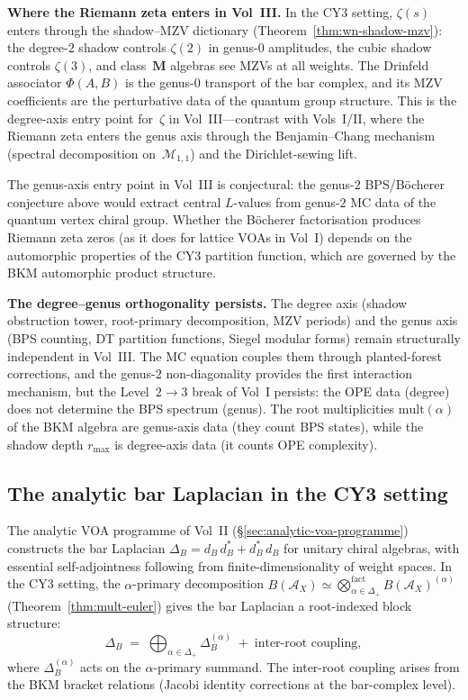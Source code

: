 \documentclass[11pt]{article}
\newcommand{\cA}{\mathcal{A}}
\newcommand{\cM}{\mathcal{M}}
\begin{document}
\textbf{Where the Riemann zeta enters in Vol~III.}
In the CY3 setting, $\zeta(s)$ enters through the
shadow--MZV dictionary (Theorem~\ref{thm:wn-shadow-mzv}):
the degree-$2$ shadow controls $\zeta(2)$ in genus-$0$ amplitudes,
the cubic shadow controls $\zeta(3)$, and class~$\mathbf{M}$
algebras see MZVs at all weights. The Drinfeld associator
$\Phi(A,B)$ is the genus-$0$ transport of the bar complex, and
its MZV coefficients are the perturbative data of the quantum
group structure. This is the degree-axis entry point for~$\zeta$
in Vol~III---contrast with Vols~I/II, where the Riemann zeta
enters the genus axis through the Benjamin--Chang mechanism
(spectral decomposition on~$\cM_{1,1}$) and the Dirichlet-sewing
lift.

The genus-axis entry point in Vol~III is conjectural: the genus-$2$
BPS/B\"ocherer conjecture above would extract central $L$-values
from genus-$2$ MC data of the quantum vertex chiral group.
Whether the B\"ocherer factorisation produces Riemann zeta zeros
(as it does for lattice VOAs in Vol~I) depends on the automorphic
properties of the CY3 partition function, which are governed by
the BKM automorphic product structure.

\textbf{The degree--genus orthogonality persists.}
The degree axis (shadow obstruction tower, root-primary
decomposition, MZV periods) and the genus axis (BPS counting,
DT partition functions, Siegel modular forms) remain
structurally independent in Vol~III. The MC equation couples
them through planted-forest corrections, and the genus-$2$
non-diagonality provides the first interaction mechanism,
but the Level~$2 \to 3$ break of Vol~I persists:
the OPE data (degree) does not determine the BPS spectrum
(genus). The root multiplicities $\mathrm{mult}(\alpha)$
of the BKM algebra are genus-axis data (they count BPS states),
while the shadow depth $r_{\max}$ is degree-axis data
(it counts OPE complexity).

\subsection{The analytic bar Laplacian in the CY3 setting}
\label{sec:analytic-bar-laplacian-cy3}

The analytic VOA programme of Vol~II
(\S\ref*{sec:analytic-voa-programme})
constructs the bar Laplacian $\Delta_B = d_B\,d_B^* +
d_B^*\,d_B$ for unitary chiral algebras, with essential
self-adjointness following from finite-dimensionality of weight
spaces. In the CY3 setting, the $\alpha$-primary decomposition
$B(\cA_X) \simeq \bigotimes_{\alpha \in \Delta_+}^{\mathrm{fact}}
B(\cA_X)^{(\alpha)}$ (Theorem~\ref{thm:mult-euler}) gives the
bar Laplacian a root-indexed block structure:
\[
 \Delta_B \;=\; \bigoplus_{\alpha \in \Delta_+}
 \Delta_B^{(\alpha)}
 \;+\; \text{inter-root coupling},
\]
where $\Delta_B^{(\alpha)}$ acts on the $\alpha$-primary
summand. The inter-root coupling arises from the BKM
bracket relations (Jacobi identity corrections at the
bar-complex level).
\end{document}
